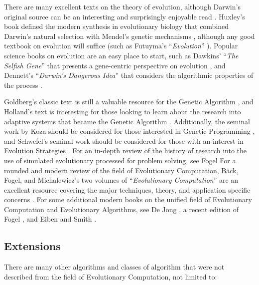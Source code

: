 \begin{bibunit}
There are many excellent texts on the theory of evolution, although Darwin's original source can be an interesting and surprisingly enjoyable read \cite{Darwin1859}. Huxley's book defined the modern synthesis in evolutionary biology that combined Darwin's natural selection with Mendel's genetic mechanisms \cite{Huxley1942}, although any good textbook on evolution will suffice (such as Futuyma's ``\emph{Evolution}'' \cite{Futuyma2009}). Popular science books on evolution are an easy place to start, such as Dawkins' ``\emph{The Selfish Gene}'' that presents a gene-centric perspective on evolution \cite{Dawkins1976}, and Dennett's ``\emph{Darwin's Dangerous Idea}'' that considers the algorithmic properties of the process \cite{Dennett1995}.

Goldberg's classic text is still a valuable resource for the Genetic Algorithm \cite{Goldberg1989}, and Holland's text is interesting for those looking to learn about the research into adaptive systems that became the Genetic Algorithm \cite{Holland1975}. Additionally, the seminal work by Koza should be considered for those interested in Genetic Programming \cite{Koza1992}, and Schwefel's seminal work should be considered for those with an interest in Evolution Strategies \cite{Schwefel1981}. For an in-depth review of the history of research into the use of simulated evolutionary processed for problem solving, see Fogel \cite{Fogel1998}
For a rounded and modern review of the field of Evolutionary Computation, B\"ack, Fogel, and Michalewicz's two volumes of ``\emph{Evolutionary Computation}'' are an excellent resource covering the major techniques, theory, and application specific concerns \cite{Baeck2000, Baeck2000a}.
For some additional modern books on the unified field of Evolutionary Computation and Evolutionary Algorithms, see De Jong \cite{Jong2006}, a recent edition of Fogel \cite{Fogel1995}, and Eiben and Smith \cite{Eiben2003}.

%
%
\subsection{Extensions}
There are many other algorithms and classes of algorithm that were not described from the field of Evolutionary Computation, not limited to:


\end{bibunit}
